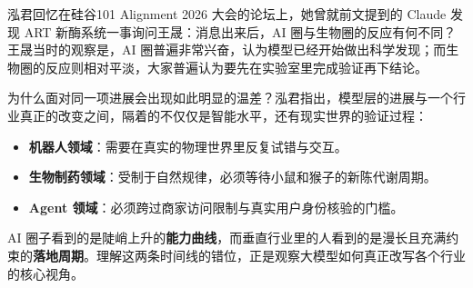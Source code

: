 \documentclass[UTF8,a4paper,11pt,fontset=fandol]{ctexart}
\begin{document}
泓君回忆在硅谷101 Alignment 2026 大会的论坛上，她曾就前文提到的 Claude 发现 ART 新酶系统一事询问王晟：消息出来后，AI 圈与生物圈的反应有何不同？王晟当时的观察是，AI 圈普遍非常兴奋，认为模型已经开始做出科学发现；而生物圈的反应则相对平淡，大家普遍认为要先在实验室里完成验证再下结论。

为什么面对同一项进展会出现如此明显的温差？泓君指出，模型层的进展与一个行业真正的改变之间，隔着的不仅仅是智能水平，还有现实世界的验证过程：

\begin{itemize}
\item \textbf{机器人领域}：需要在真实的物理世界里反复试错与交互。
\item \textbf{生物制药领域}：受制于自然规律，必须等待小鼠和猴子的新陈代谢周期。
\item \textbf{Agent 领域}：必须跨过商家访问限制与真实用户身份核验的门槛。
\end{itemize}

AI 圈子看到的是陡峭上升的\textbf{能力曲线}，而垂直行业里的人看到的是漫长且充满约束的\textbf{落地周期}。理解这两条时间线的错位，正是观察大模型如何真正改写各个行业的核心视角。
\end{document}
